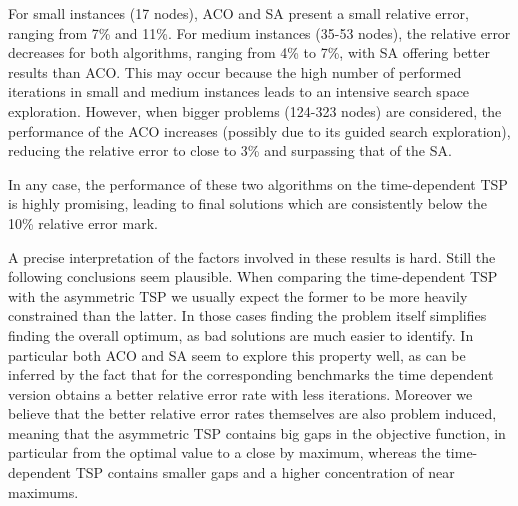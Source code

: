 For small instances (17 nodes), ACO and SA present a small relative error, ranging from 7\% and 11\%. For medium instances (35-53 nodes), the relative error decreases for both algorithms, ranging from 4\% to 7\%, with SA offering better results than ACO. This may occur because the high number of performed iterations in small and medium instances leads to an intensive search space exploration. However, when  bigger problems (124-323 nodes) are considered, the performance of the ACO increases (possibly due to its guided search exploration), reducing the relative error to close to 3\% and surpassing that of the SA.

In any case, the performance of these two algorithms on the time-dependent TSP is highly promising, leading to final solutions which are consistently below the 10\% relative error mark. 

A precise interpretation of the factors involved in these results is hard. Still the following conclusions seem plausible. When comparing the time-dependent TSP with the asymmetric TSP we usually expect the former to be more heavily constrained than the latter. In those cases finding the problem itself simplifies finding the overall optimum, as bad solutions are much easier to identify. In particular both ACO and SA seem to explore this property well, as can be inferred by the fact that for the corresponding benchmarks the time dependent version obtains a better relative error rate with less iterations. Moreover we believe that the better relative error rates themselves are also problem induced, meaning that the asymmetric TSP contains big gaps in the objective function, in particular from the optimal value to a close by maximum, whereas the time-dependent TSP contains smaller gaps and a higher concentration of near maximums. 



